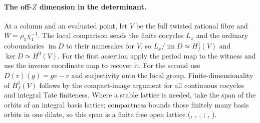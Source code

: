 \paragraph{The off-$Z$ dimension in the determinant.}
At a column and an evaluated point, let $V$ be the full twisted rational
fibre and $W=\rho_\pi\chi_1^{-1}$. The local comparison sends the
finite cocycles $L_x$ and the ordinary coboundaries $\operatorname{im}D$
to their namesakes for $V$, so
$L_x/\operatorname{im}D\simeq H_f^1(V)$ and
$\ker D\simeq H^0(V)$. For the first assertion apply the period
map to the witness and use the inverse coordinate map to recover it.
For the second use $D(v)(g)=gv-v$ and surjectivity onto the local
group. Finite-dimensionality of $H_f^1(V)$ follows by the compact-image
argument for all continuous cocycles and integral Tate finiteness.
Where a stable lattice is needed, take the span of the orbits of an
integral basis lattice; compactness bounds those finitely many basis
orbits in one dilate, so this span is a finite free open lattice
(, , ,
;
, ).

